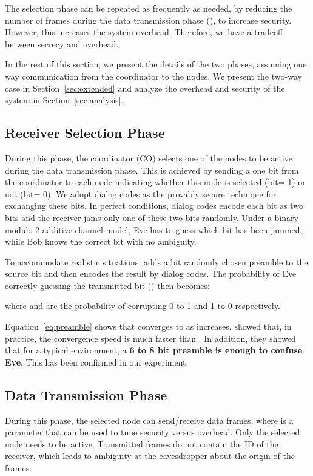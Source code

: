 \documentclass[10pt,letterpaper,conference]{IEEEtran}
\begin{document}
The selection phase can be repeated as frequently as needed, by reducing the
number of frames during the data transmission phase (), to increase security.
However, this increases the system overhead. Therefore, we have a tradeoff
between secrecy and overhead.

In the rest of this section, we present the details of the two phases, assuming
one way communication from the coordinator to the nodes. We present the
two-way case in Section~\ref{sec:extended} and analyze the overhead and security of
the system in Section~\ref{sec:analysis}.

\subsection{Receiver Selection Phase}

During this phase, the coordinator (CO) selects one of the  nodes to be active during the data transmission phase. This is achieved by sending a one bit from the coordinator to each node indicating whether this node is selected (bit= 1) or not (bit= 0). We adopt dialog codes \cite{Arora2009} as the provably secure technique for exchanging these bits. In perfect conditions, dialog codes encode each bit as two bits and the receiver jams only one of these two bits randomly. Under a binary modulo-2 additive channel model, Eve has to guess which bit has been jammed, while Bob knows the correct bit with no ambiguity.

To accommodate realistic situations, \cite{Arora2009} adds a  bit randomly
chosen preamble to the source bit and then encodes the result by dialog codes. The probability of Eve correctly guessing the transmitted bit () then becomes:



where  and  are the probability of corrupting 0 to 1 and 1 to 0 respectively.

Equation~\ref{eq:preamble} shows that  converges to  as  increases. \cite{Arora2009} showed that, in practice, the convergence speed is
much faster than . In addition, they showed that for a typical environment, a \textbf{6 to 8 bit preamble is enough to confuse Eve}. This has been confirmed in our experiment.

\subsection{Data Transmission Phase}

During this phase, the selected node can send/receive  data frames, where 
is a parameter that can be used to tune security versus overhead. Only the
selected node needs to be active. Transmitted frames do not contain the ID of
the receiver, which leads to ambiguity at the eavesdropper about the origin of
the frames. 
\end{document}
